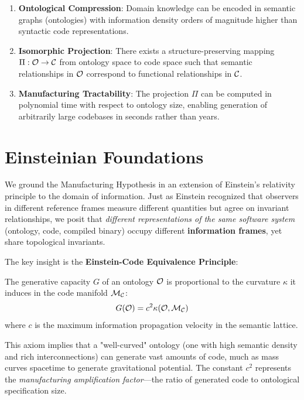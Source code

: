 \begin{enumerate}
    \item \textbf{Ontological Compression}: Domain knowledge can be encoded in semantic graphs (ontologies) with information density orders of magnitude higher than syntactic code representations.

    \item \textbf{Isomorphic Projection}: There exists a structure-preserving mapping $\Pi: \mathcal{O} \to \mathcal{C}$ from ontology space to code space such that semantic relationships in $\mathcal{O}$ correspond to functional relationships in $\mathcal{C}$.

    \item \textbf{Manufacturing Tractability}: The projection $\Pi$ can be computed in polynomial time with respect to ontology size, enabling generation of arbitrarily large codebases in seconds rather than years.
\end{enumerate}

\section{Einsteinian Foundations}

We ground the Manufacturing Hypothesis in an extension of Einstein's relativity principle to the domain of information. Just as Einstein recognized that observers in different reference frames measure different quantities but agree on invariant relationships, we posit that \textit{different representations of the same software system} (ontology, code, compiled binary) occupy different \textbf{information frames}, yet share topological invariants.

The key insight is the \textbf{Einstein-Code Equivalence Principle}:

\begin{axiom}
\label{axiom:einstein-code}
The generative capacity $G$ of an ontology $\mathcal{O}$ is proportional to the curvature $\kappa$ it induces in the code manifold $\mathcal{M}_{\mathcal{C}}$:
\begin{equation}
G(\mathcal{O}) = c^2 \kappa(\mathcal{O}, \mathcal{M}_{\mathcal{C}})
\end{equation}
where $c$ is the maximum information propagation velocity in the semantic lattice.
\end{axiom}

This axiom implies that a "well-curved" ontology (one with high semantic density and rich interconnections) can generate vast amounts of code, much as mass curves spacetime to generate gravitational potential. The constant $c^2$ represents the \textit{manufacturing amplification factor}---the ratio of generated code to ontological specification size.

